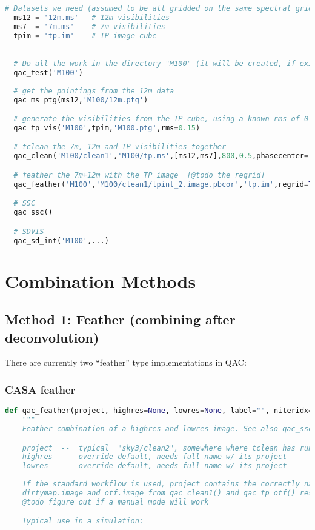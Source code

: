 \documentclass[12pt,a4paper]{article}
\begin{document}
\begin{lstlisting}[language=Python]
  # Datasets we need (assumed to be all gridded on the same spectral grid)
  ms12 = '12m.ms'   # 12m visibilities
  ms7  = '7m.ms'    # 7m visibilities
  tpim = 'tp.im'    # TP image cube

  
  # Do all the work in the directory "M100" (it will be created, if exists, all contents removed)
  qac_test('M100')
  
  # get the pointings from the 12m data
  qac_ms_ptg(ms12,'M100/12m.ptg')

  # generate the visibilities from the TP cube, using a known rms of 0.15 Jy/beam in the TP cube
  qac_tp_vis('M100',tpim,'M100.ptg',rms=0.15)

  # tclean the 7m, 12m and TP visibilities together
  qac_clean('M100/clean1','M100/tp.ms',[ms12,ms7],800,0.5,phasecenter='J2000 12h22m54.900s +15d49m15.000s',niter=[0,10000])

  # feather the 7m+12m with the TP image  [@todo the regrid]
  qac_feather('M100','M100/clean1/tpint_2.image.pbcor','tp.im',regrid=True)

  # SSC
  qac_ssc()

  # SDVIS
  qac_sd_int('M100',...)

\end{lstlisting}


\section{Combination Methods}

\subsection{Method 1: Feather (combining after deconvolution)}

There are currently two ``feather'' type implementations in QAC:

\subsubsection{CASA feather}

\begin{lstlisting}[language=Python]
def qac_feather(project, highres=None, lowres=None, label="", niteridx=0, name="dirtymap"):
    """
    Feather combination of a highres and lowres image. See also qac_ssc()

    project  --  typical  "sky3/clean2", somewhere where tclean has run
    highres  --  override default, needs full name w/ its project
    lowres   --  override default, needs full name w/ its project
    
    If the standard workflow is used, project contains the correctly named
    dirtymap.image and otf.image from qac_clean1() and qac_tp_otf() resp.
    @todo figure out if a manual mode will work

    Typical use in a simulation:
\end{lstlisting}
\end{document}
